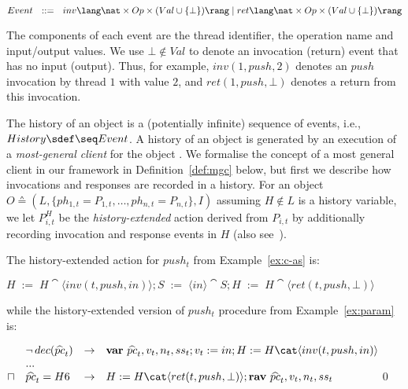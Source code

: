 \documentclass[11pt]{llncs}
\def \hpctvar{{\widehat{pc}_t}}
\def \endbox{\hfill \qed}
\def \asgn  {{\;:=\;}}
\def \var {{\bf var}\ }
\def \rav {{\bf rav}\ }
\newcommand{\refex}[1]{Example~\ref{#1}}
\newcommand{\refdef}[1]{Definition~\ref{#1}}
\begin{document}
\hfill 
$Event \ \  ::= \ \  inv \lang \nat \times Op \times (Val \cup \{\bot\}) \rang \mid ret \lang \nat
\times Op \times (Val \cup \{\bot\}) \rang$\hfill{} \smallskip

\noindent
The components of each event are the thread identifier, the operation
name and input/output values. We use $\bot \notin Val$  to
denote an invocation (return) event that has no input (output). Thus,
for example, $inv(1, push, 2)$ denotes an $push$ invocation by thread
$1$ with value $2$, and $ret(1, push, \bot)$ denotes a return from
this invocation.  

The history of an object is a (potentially infinite) sequence of
events, i.e., $History \sdef \seq Event$. A history of an object is
generated by an execution of a \emph{most-general client} for the
object \cite{Doherty03}. We formalise the concept of a most general
client in our framework in \refdef{def:mgc} below, but first we
describe how invocations and responses are recorded in a history. For
an object
$O \sdef (L, \{ph_{1,t} = P_{1,t}, \dots, ph_{n,t} = P_{n,t}\}, I)$
assuming $H \notin L$ is a history variable, we let $P_{i,t}^H$ be the
\emph{history-extended} action derived from $P_{i,t}$ by additionally
recording invocation and response events in $H$ (also see~\cite{DSW11TOPLAS}).
\begin{example}
\label{ex:hist-ext}
The history-extended action for $push_t$ from \refex{ex:c-as}
is:\smallskip

\hfill $H \asgn H \cat \langle inv(t, push, in) \rangle ; 
S \asgn \langle in
\rangle \cat S ;  H \asgn H \cat \langle ret(t, push, \bot) \rangle$\hfill \smallskip

\noindent while the history-extended version of $push_t$ procedure
from \refex{ex:param} is: 
\smallskip

\hfill
$\begin{array}[b]{@{}llll@{}}
    & \neg\, dec(\hpctvar) & \to &  \var \hpctvar, v_t, n_t, ss_t ; v_t\asgn
    in ;   H \asgn H \cat \langle inv(t, push, in) \rangle  \\
& ...\\
    \sqcap & \hpctvar = H6 &\to &  H \asgn H \cat \langle ret(t, push,
    \bot) \rangle ;  \rav \hpctvar, v_t, n_t, ss_t 
\end{array}$\hfill \endbox

\end{example}
\end{document}

